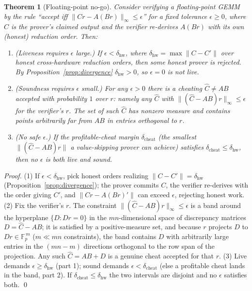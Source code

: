 \documentclass[11pt]{article}
\newtheorem{theorem}{Theorem}
\newcommand{\F}{\mathbb{F}}
\begin{document}
\begin{theorem}[Floating-point no-go]
\label{thm:no-go}
Consider verifying a floating-point GEMM by the rule ``accept iff $\lVert C r - A(Br)
\rVert_\infty \le \epsilon$'' for a fixed tolerance $\epsilon \ge 0$, where $C$ is the
prover's claimed output and the verifier re-derives $A(Br)$ with its own (honest) reduction
order. Then:
\begin{enumerate}[leftmargin=1.6em]
\item \textup{(Liveness requires $\epsilon$ large.)} If $\epsilon < \delta_{\mathrm{hw}}$,
where $\delta_{\mathrm{hw}} = \max \lVert C - C'\rVert$ over honest cross-hardware reduction
orders, then some honest prover is rejected. By Proposition~\ref{prop:divergence}
$\delta_{\mathrm{hw}} > 0$, so $\epsilon = 0$ is not live.
\item \textup{(Soundness requires $\epsilon$ small.)} For any $\epsilon > 0$ there is a
cheating $\hat C \ne AB$ accepted with probability $1$ over $r$: namely any $\hat C$ with
$\lVert (\hat C - AB) r\rVert_\infty \le \epsilon$ for the verifier's $r$. The set of such
$\hat C$ has nonzero measure and contains points arbitrarily far from $AB$ in entries
orthogonal to $r$.
\item \textup{(No safe $\epsilon$.)} If the profitable-cheat margin $\delta_{\mathrm{cheat}}$
\textup{(}the smallest $\lVert(\hat C - AB)r\rVert$ a value-skipping prover can achieve\textup{)}
satisfies $\delta_{\mathrm{cheat}} \le \delta_{\mathrm{hw}}$, then \emph{no} $\epsilon$ is both
live and sound.
\end{enumerate}
\end{theorem}

\begin{proof}
(1) If $\epsilon < \delta_{\mathrm{hw}}$, pick honest orders realizing $\lVert C -
C'\rVert = \delta_{\mathrm{hw}}$ (Proposition~\ref{prop:divergence}); the prover commits $C$,
the verifier re-derives with the order giving $C'$, and $\lVert C r - A(B r)'\rVert$ can
exceed $\epsilon$, rejecting honest work. (2) Fix the verifier's $r$. The constraint $\lVert
(\hat C - AB) r\rVert_\infty \le \epsilon$ is a band around the hyperplane $\{D : Dr = 0\}$ in
the $mn$-dimensional space of discrepancy matrices $D = \hat C - AB$; it is satisfied by a
positive-measure set, and because $r$ projects $D$ to $Dr \in \F_p^{\,m}$ ($m \ll mn$
constraints), the band contains $D$ with arbitrarily large entries in the $(mn - m)$
directions orthogonal to the row span of the projection. Any such $\hat C = AB + D$ is a
genuine cheat accepted for that $r$. (3) Live demands $\epsilon \ge \delta_{\mathrm{hw}}$
(part 1); sound demands $\epsilon < \delta_{\mathrm{cheat}}$ (else a profitable cheat lands in
the band, part 2). If $\delta_{\mathrm{cheat}} \le \delta_{\mathrm{hw}}$ the two intervals are
disjoint and no $\epsilon$ satisfies both. \qed
\end{proof}
\end{document}
